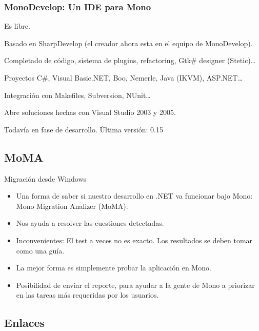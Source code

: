 \documentclass{beamer}
\begin{document}
\begin{frame}
  \frametitle{MonoDevelop: Un IDE para Mono}

  \begin{itemize}
    \begin{small}
      \item Es libre.
      \item Basado en SharpDevelop (el creador ahora esta en el equipo de MonoDevelop).
      \item Completado de código, sistema de plugins, refactoring, Gtk\# designer (Stetic)\ldots
      \item Proyectos C\#, Visual Basic.NET, Boo, Nemerle, Java (IKVM), ASP.NET\ldots
      \item Integración con Makefiles, Subversion, NUnit\ldots
      \item Abre soluciones hechas con Visual Studio 2003 y 2005.
      \item \alert{Todavía en fase de desarrollo. Última versión: 0.15}
    \end{small}
  \end{itemize}
\end{frame}


\subsection{MoMA}

\begin{frame}{Migración desde Windows}
  \begin{itemize}
    \item Una forma de saber si nuestro desarrollo en .NET va funcionar
      bajo Mono: Mono Migration Analizer (MoMA).
    \item Nos ayuda a resolver las cuestiones detectadas.
    \item \alert{Inconvenientes:} El test a veces no es exacto. Los resultados
      se deben tomar como una guía.
    \item La mejor forma es simplemente probar la aplicación en Mono.
    \item Posibilidad de enviar el reporte, para ayudar a la gente de Mono
      a priorizar en las tareas más requeridas por los usuarios.
  \end{itemize}
\end{frame}


\subsection{Enlaces}
\end{document}

